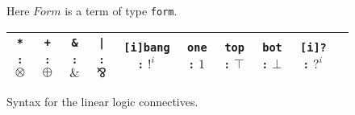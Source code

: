 \documentclass{llncs}
\newcommand{\tup}[1]{\langle#1\rangle}
\begin{document}
\begin{figure}[t]
{%
}
\vspace{-4mm}
\caption{Here $Form$ is a term of type \texttt{form}.} 
\label{fig:syntax}
\begin{center}
\begin{tabular}{c@{\quad}c@{\quad}c@{\quad}c@{\quad}c@{\quad}c@{\quad}c@{\quad}c@{\quad}c@{\quad}c}
\toprule
\texttt{*} : $\otimes$ & \texttt{+} : $\oplus$ & \texttt{\&} : $\&$ & \texttt{|} : $\bindnasrepma$ & \texttt{[i]bang} : $!^i$ &
\texttt{one} : $1$ &  \texttt{top} : $\top$ & \texttt{bot} : $\bot$ & \texttt{[i]?} : $?^i$ \\
\bottomrule
\end{tabular}
\end{center}
\vspace{-4mm}
\caption{Syntax for the linear logic connectives.}
\label{fig:syntax_ll}
\vspace{-4mm}
\end{figure}
\end{document}
